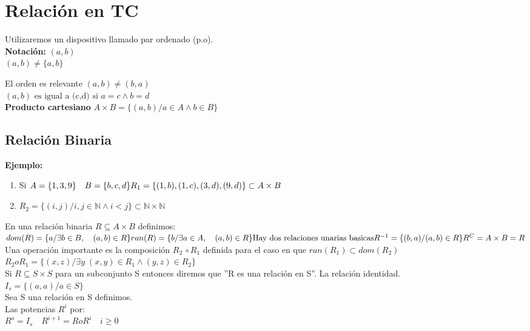 \chapter{Relación en TC}
Utilizaremos un dispositivo llamado par ordenado (p.o).\\
\textbf{Notación: }$(a,b)$\\
$(a,b)\not=\lbrace a,b\rbrace$

El orden es relevante $(a,b)\not=(b,a)$\\
$(a,b) \mbox{ es igual a (c,d) si } a=c\land b=d$\\
\textbf{Producto cartesiano}
$A\times B=\{ (a,b)/a\in A \land b\in B\}$

\section{Relación Binaria}
\textbf{Ejemplo: }
\begin{enumerate}
\item Si $A=\lbrace1,3,9\rbrace \quad B=\lbrace b,c,d\rbrace \\
	R_1=\lbrace (1,b),(1,c),(3,d),(9,d)\rbrace \subset A\times B$
\item $R_2=\lbrace (i,j)/ i,j\in \mathds{N} \land i<j\rbrace \subset \mathds{N}\times\mathds{N}$
\end{enumerate}

En una relación binaria $R\subseteq A\times B$ definimos:
$dom(R)=\lbrace a/\exists b\in B ,\quad (a,b)\in R\rbrace\\
ran(R)=\lbrace b/\exists a\in A ,\quad (a,b)\in R\rbrace\\
\mbox{Hay dos relaciones unarias basicas}\\
R^{-1}=\lbrace(b,a)/(a,b)\in R\rbrace\\
R^C= A\times B= R$\\
Una operación importante es la composición $R_2\, \circ R_1$ definida para el caso en que $ran(R_1)\subset dom(R_2)$\\
$R_2oR_1=\lbrace (x,z)/\exists y\; (x,y)\in R_1 \land (y,z)\in R_2\rbrace$\\
Si $R\subseteq S\times S$ para un subconjunto S entonces diremos que ''R es una relación en S''. La relación identidad.\\
$I_s=\lbrace (a,a)/a\in S\rbrace$\\
Sea S una relación en S definimos.\\

Las potencias $R^i$ por:\\
$R^o=I_s \quad R^{i+1}=RoR^i \quad i\geq 0$\\

